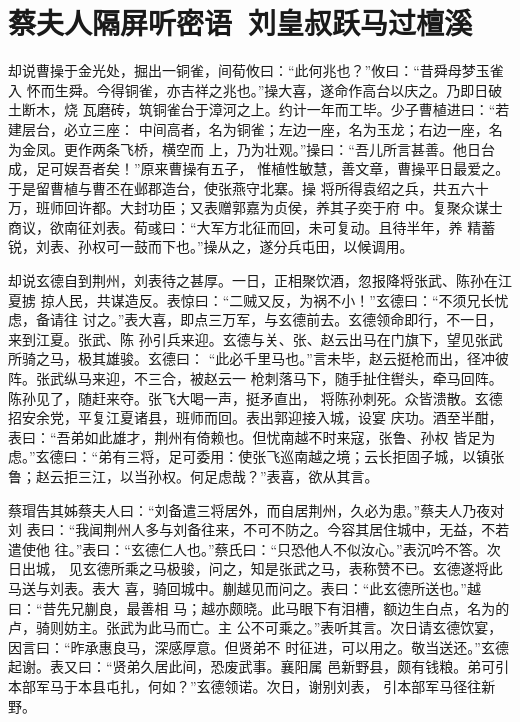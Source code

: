 \chapter{蔡夫人隔屏听密语~刘皇叔跃马过檀溪}

却说曹操于金光处，掘出一铜雀，间荀攸曰：“此何兆也？”攸曰：“昔舜母梦玉雀入
怀而生舜。今得铜雀，亦吉祥之兆也。”操大喜，遂命作高台以庆之。乃即日破土断木，烧
瓦磨砖，筑铜雀台于漳河之上。约计一年而工毕。少子曹植进曰：“若建层台，必立三座：
中间高者，名为铜雀；左边一座，名为玉龙；右边一座，名为金凤。更作两条飞桥，横空而
上，乃为壮观。”操曰：“吾儿所言甚善。他日台成，足可娱吾者矣！”原来曹操有五子，
惟植性敏慧，善文章，曹操平日最爱之。于是留曹植与曹丕在邺郡造台，使张燕守北寨。操
将所得袁绍之兵，共五六十万，班师回许都。大封功臣；又表赠郭嘉为贞侯，养其子奕于府
中。复聚众谋士商议，欲南征刘表。荀彧曰：“大军方北征而回，未可复动。且待半年，养
精蓄锐，刘表、孙权可一鼓而下也。”操从之，遂分兵屯田，以候调用。

却说玄德自到荆州，刘表待之甚厚。一日，正相聚饮酒，忽报降将张武、陈孙在江夏掳
掠人民，共谋造反。表惊曰：“二贼又反，为祸不小！”玄德曰：“不须兄长忧虑，备请往
讨之。”表大喜，即点三万军，与玄德前去。玄德领命即行，不一日，来到江夏。张武、陈
孙引兵来迎。玄德与关、张、赵云出马在门旗下，望见张武所骑之马，极其雄骏。玄德曰：
“此必千里马也。”言未毕，赵云挺枪而出，径冲彼阵。张武纵马来迎，不三合，被赵云一
枪刺落马下，随手扯住辔头，牵马回阵。陈孙见了，随赶来夺。张飞大喝一声，挺矛直出，
将陈孙刺死。众皆溃散。玄德招安余党，平复江夏诸县，班师而回。表出郭迎接入城，设宴
庆功。酒至半酣，表曰：“吾弟如此雄才，荆州有倚赖也。但忧南越不时来寇，张鲁、孙权
皆足为虑。”玄德曰：“弟有三将，足可委用：使张飞巡南越之境；云长拒固子城，以镇张
鲁；赵云拒三江，以当孙权。何足虑哉？”表喜，欲从其言。

蔡瑁告其姊蔡夫人曰：“刘备遣三将居外，而自居荆州，久必为患。”蔡夫人乃夜对刘
表曰：“我闻荆州人多与刘备往来，不可不防之。今容其居住城中，无益，不若遣使他
往。”表曰：“玄德仁人也。”蔡氏曰：“只恐他人不似汝心。”表沉吟不答。次日出城，
见玄德所乘之马极骏，问之，知是张武之马，表称赞不已。玄德遂将此马送与刘表。表大
喜，骑回城中。蒯越见而问之。表曰：“此玄德所送也。”越曰：“昔先兄蒯良，最善相
马；越亦颇晓。此马眼下有泪槽，额边生白点，名为的卢，骑则妨主。张武为此马而亡。主
公不可乘之。”表听其言。次日请玄德饮宴，因言曰：“昨承惠良马，深感厚意。但贤弟不
时征进，可以用之。敬当送还。”玄德起谢。表又曰：“贤弟久居此间，恐废武事。襄阳属
邑新野县，颇有钱粮。弟可引本部军马于本县屯扎，何如？”玄德领诺。次日，谢别刘表，
引本部军马径往新野。

